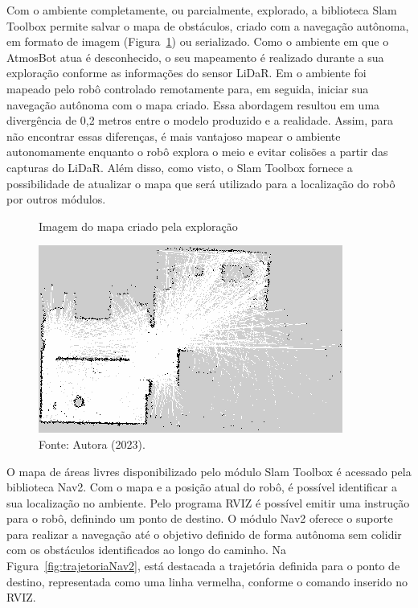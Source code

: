 Com o ambiente completamente, ou parcialmente, explorado, a biblioteca Slam Toolbox permite salvar o mapa de obstáculos, criado com a navegação autônoma, em formato de imagem (Figura~\ref{fig:mapaImagem}) ou serializado. Como o ambiente em que o AtmosBot atua é desconhecido, o seu mapeamento é realizado durante a sua exploração conforme as informações do sensor LiDaR. Em \citet{navegacaoSlam:2022} o ambiente foi mapeado pelo robô controlado remotamente para, em seguida, iniciar sua navegação autônoma com o mapa criado. Essa abordagem resultou em uma divergência de 0,2 metros entre o modelo produzido e a realidade. Assim, para não encontrar essas diferenças, é mais vantajoso mapear o ambiente autonomamente enquanto o robô explora o meio e evitar colisões a partir das capturas do LiDaR. Além disso, como visto, o Slam Toolbox fornece a possibilidade de atualizar o mapa que será utilizado para a localização do robô por outros módulos. 


\begin{figure}[H]
    \centering
    \caption{Imagem do mapa criado pela exploração}
    \includegraphics[scale=1]{saved_map.png}
    \caption*{Fonte: Autora (2023).}
    \label{fig:mapaImagem}
\end{figure}


O mapa de áreas livres disponibilizado pelo módulo Slam Toolbox é acessado pela biblioteca Nav2. Com o mapa e a posição atual do robô, é possível identificar a sua localização no ambiente. Pelo programa RVIZ é possível emitir uma instrução para o robô, definindo um ponto de destino. O módulo Nav2 oferece o suporte para realizar a navegação até o objetivo definido de forma autônoma sem colidir com os obstáculos identificados ao longo do caminho. Na Figura~\ref{fig:trajetoriaNav2}, está destacada a trajetória definida para o ponto de destino, representada como uma linha vermelha, conforme o comando inserido no RVIZ.


